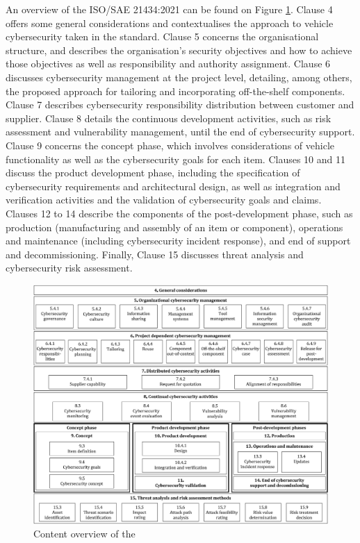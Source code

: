 An overview of the ISO/SAE 21434:2021 can be found on Figure \ref{fig:iso21434toc}. Clause 4 offers some general considerations and contextualises the approach to vehicle cybersecurity taken in the standard. Clause 5 concerns the organisational structure, and describes the organisation's security objectives and how to achieve those objectives as well as responsibility and authority assignment. Clause 6 discusses cybersecurity management at the project level, detailing, among others, the proposed approach for tailoring and incorporating off-the-shelf components. Clause 7 describes cybersecurity responsibility distribution between customer and supplier. Clause 8 details the continuous development activities, such as risk assessment and vulnerability management, until the end of cybersecurity support. Clause 9 concerns the concept phase, which involves considerations of vehicle functionality as well as the cybersecurity goals for each item. Clauses 10 and 11 discuss the product development phase, including the specification of cybersecurity requirements and architectural design, as well as integration and verification activities and the validation of cybersecurity goals and claims. Clauses 12 to 14 describe the components of the post-development phase, such as production (manufacturing and assembly of an item or component), operations and maintenance (including cybersecurity incident response), and end of support and decommissioning. Finally, Clause 15 discusses threat analysis and cybersecurity risk assessment.

\begin{figure}
    \centering
    \includegraphics[width = \textwidth]{img/parts/introduction/ISO 21434 ToC.png}
    \caption{Content overview of the \cite{ISO21434}}
    \label{fig:iso21434toc}
\end{figure}

